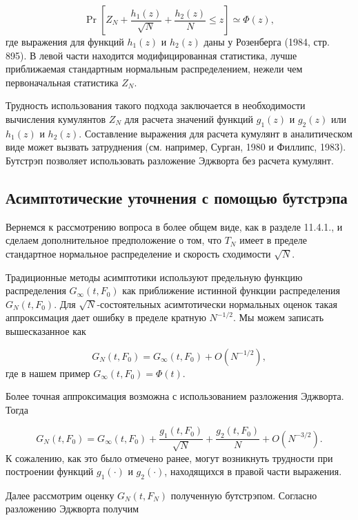 \begin{equation}
\Pr \left[ Z_N+\dfrac{h_1(z)}{\sqrt{N}}+\dfrac{h_2(z)}{N} \leq z \right] \simeq \Phi(z),
\end{equation}
где выражения для функций $h_1(z)$ и $h_2(z)$ даны у Розенберга (1984, стр. 895). В левой части находится модифицированная статистика, лучше приближаемая стандартным нормальным распределением, нежели чем  первоначальная статистика $Z_N$.

Трудность использования такого подхода заключается в необходимости вычисления кумулянтов $Z_N$ для расчета значений функций $g_1(z)$ и $g_2(z)$ или $h_1(z)$ и $h_2(z)$. Составление выражения для расчета кумулянт в аналитическом виде может вызвать затруднения (см. например, Сурган, 1980 и Филлипс, 1983). Бутстрэп позволяет использовать разложение Эджворта без расчета кумулянт.

\subsection{Асимптотические уточнения с помощью бутстрэпа}

Вернемся к рассмотрению  вопроса в более общем виде, как в разделе 11.4.1., и сделаем дополнительное предположение о том, что $T_N$  имеет в пределе стандартное нормальное распределение и скорость сходимости $\sqrt{N}$.

Традиционные методы асимптотики используют предельную  функцию распределения $G_{\infty}(t,F_0)$ как приближение истинной функции распределения $G_N(t,F_0)$. Для $\sqrt{N}$-состоятельных асимтотически нормальных оценок такая аппроксимация дает ошибку в пределе кратную $N^{-1/2}$. Мы можем записать вышесказанное как

\begin{equation}
G_N(t,F_0)=G_{\infty}(t,F_0)+O(N^{-1/2}),
\end{equation}
где в нашем пример $G_{\infty}(t,F_0)=\Phi(t)$.

Более точная аппроксимация возможна с использованием разложения Эджворта. Тогда

\begin{equation}
G_N(t,F_0)=G_{\infty}(t,F_0)+\dfrac{g_1(t,F_0)}{\sqrt{N}}+\dfrac{g_2(t,F_0)}{N}+O(N^{-3/2}).
\end{equation}
К сожалению, как это было отмечено ранее, могут возникнуть трудности при построении функций $g_1(\cdot)$ и $g_2(\cdot)$, находящихся в правой части выражения.

Далее рассмотрим оценку $G_N(t,F_N)$ полученную бутстрэпом. Согласно разложению Эджворта получим 

